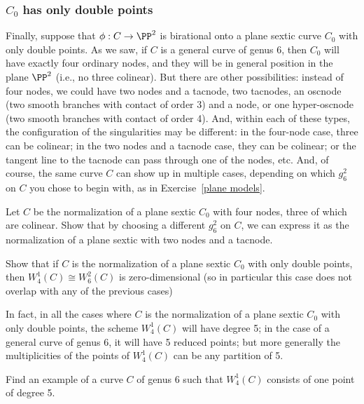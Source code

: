 \subsubsection{$C_0$ has only double points}
Finally, suppose that $\phi : C \to \PP^2$ is birational onto a plane sextic curve $C_0$ with only double points. As we saw, if $C$ is a general curve of genus 6, then $C_0$ will have exactly four ordinary nodes, and they will be in general position in the plane $\PP^2$ (i.e., no three colinear). But there are other possibilities: instead of four nodes, we could have two nodes and a tacnode, two tacnodes, an oscnode (two smooth branches with contact of order 3) and a node, or one hyper-oscnode (two smooth branches with contact of order 4). And, within each of these types, the configuration of the singularities may be different: in the four-node case, three can be colinear; in the two nodes and a tacnode case, they can be colinear; or the tangent line to the tacnode can pass through one of the nodes, etc. And, of course, the same curve $C$ can show up in multiple cases, depending on which $g^2_6$ on $C$ you chose to begin with, as in Exercise~\ref{plane models}. 

\begin{exercise}\label{plane models}
Let $C$ be the normalization of a plane sextic $C_0$ with four nodes, three of which are colinear. Show that by choosing a different $g^2_6$ on $C$, we can express it as the normalization of a plane sextic with two nodes and a tacnode.
\end{exercise}


\begin{exercise}
Show that if $C$ is the normalization of a plane sextic $C_0$ with only double points, then $W^1_4(C) \cong W^2_6(C)$ is zero-dimensional (so in particular this case does not overlap with any of the previous cases)
\end{exercise}

In fact, in all the cases where $C$ is the normalization of a plane sextic $C_0$ with only double points, the scheme $W^1_4(C)$ will have degree 5; in the  case of a general curve of genus 6, it will have 5 reduced points; but more generally the multiplicities of the points of $W^1_4(C)$ can be any partition of 5.


\begin{exercise}
Find an example of a curve $C$ of genus 6 such that $W^1_4(C)$ consists of one point of degree 5.
\end{exercise}





